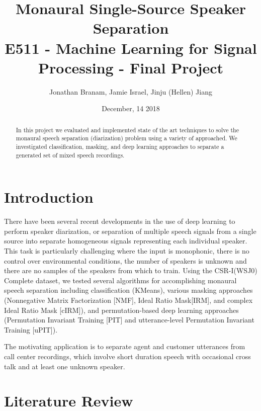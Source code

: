 \documentclass[journal, a4paper]{IEEEtran}
\begin{document}
	\title{Monaural Single-Source Speaker Separation \\
	{\large E511 - Machine Learning for Signal Processing - Final Project}}
	\author{Jonathan Branam, Jamie Israel, Jinju (Hellen) Jiang}
	\date{December, 14 2018}
	\maketitle
%
\begin{abstract}
In this project we evaluated and implemented state of the art techniques to solve the monaural speech separation (diarization) problem using a variety of approached. We investigated classification, masking, and deep learning approaches to separate a generated set of mixed speech recordings.
\end{abstract}

\section{Introduction}
There have been several recent developments in the use of deep learning to perform speaker diarization, or separation of multiple speech signals from a single source into separate homogeneous signals representing each individual speaker. This task is particularly challenging where the input is monophonic, there is no control over environmental conditions, the number of speakers is unknown and there are no samples of the speakers from which to train. Using the CSR-I(WSJ0) Complete dataset\cite{garofolo:wsj0}, we tested several algorithms for accomplishing monaural speech separation including classification (KMeans), various masking approaches (Nonnegative Matrix Factorization [NMF], Ideal Ratio Mask[IRM], and complex Ideal Ratio Mask [cIRM]), and permutation-based deep learning approaches (Permutation Invariant Training [PIT] and utterance-level Permutation Invariant Training [uPIT]).

The motivating application is to separate agent and customer utterances from call center recordings, which involve short duration speech with occasional cross talk and at least one unknown speaker.

\section{Literature Review}
\end{document}
